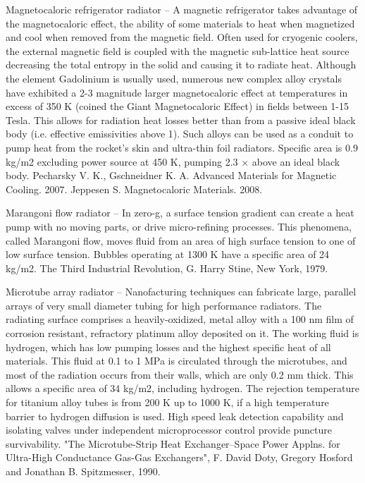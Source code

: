 \documentclass[a4paper]{book}
\begin{document}
Magnetocaloric refrigerator radiator – A magnetic refrigerator takes advantage of the magnetocaloric effect, the ability of some materials to heat when magnetized and cool when removed from the magnetic field.  Often used for cryogenic coolers, the external magnetic field is coupled with the magnetic sub-lattice heat source decreasing the total entropy in the solid and causing it to radiate heat.  Although the element Gadolinium is usually used, numerous new complex alloy crystals have exhibited a 2-3 magnitude larger magnetocaloric effect at temperatures in excess of 350 K (coined the Giant Magnetocaloric Effect) in fields between 1-15 Tesla.  This allows for radiation heat losses better than from a passive ideal black body (i.e. effective emissivities above 1).  Such alloys can be used as a conduit to pump heat from the rocket’s skin and ultra-thin foil radiators.  Specific area is 0.9 kg/m2 excluding power source at 450 K, pumping 2.3 × above an ideal black body.
Pecharsky V. K., Gschneidner K. A. Advanced Materials for Magnetic Cooling. 2007.
Jeppesen S. Magnetocaloric Materials. 2008.
 
Marangoni flow radiator – In zero-g, a surface tension gradient can create a heat pump with no moving parts, or drive micro-refining processes. This phenomena, called Marangoni flow, moves fluid from an area of high surface tension to one of low surface tension.  Bubbles operating at 1300 K have a specific area of 24 kg/m2. The Third Industrial Revolution, G. Harry Stine, New York, 1979.
 
Microtube array radiator – Nanofacturing techniques can fabricate large, parallel arrays of very small diameter tubing for high performance radiators. The radiating surface comprises a heavily-oxidized, metal alloy with a 100 nm film of corrosion resistant, refractory platinum alloy deposited on it. The working fluid is hydrogen, which has low pumping losses and the highest specific heat of all materials. This fluid at 0.1 to 1 MPa is circulated through the microtubes, and most of the radiation occurs from their walls, which are only 0.2 mm thick. This allows a specific area of 34 kg/m2, including hydrogen. The rejection temperature for titanium alloy tubes is from 200 K up to 1000 K, if a high temperature barrier to hydrogen diffusion is used. High speed leak detection capability and isolating valves under independent microprocessor control provide puncture survivability.  "The Microtube-Strip Heat Exchanger--Space Power Applns. for Ultra-High Conductance Gas-Gas Exchangers", F. David Doty, Gregory Hosford and Jonathan B. Spitzmesser, 1990.
 
\end{document}
